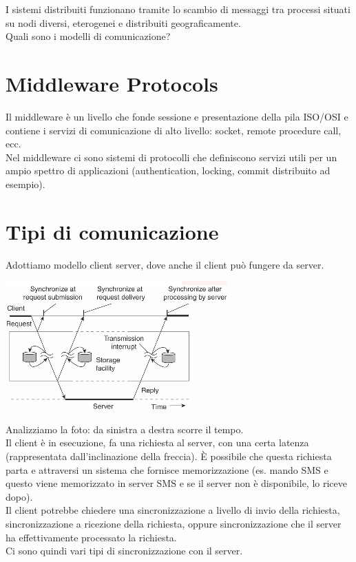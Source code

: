 I sistemi distribuiti funzionano tramite lo scambio di messaggi tra processi situati su nodi diversi, eterogenei e distribuiti geograficamente.\\
Quali sono i modelli di comunicazione?

\section{Middleware Protocols}
Il middleware è un livello che fonde sessione e presentazione della pila ISO/OSI e contiene i servizi di comunicazione di alto livello: socket, remote procedure call, ecc.\\
Nel middleware ci sono sistemi di protocolli che definiscono servizi utili per un ampio spettro di applicazioni (authentication, locking, commit distribuito ad esempio).

\section{Tipi di comunicazione}
Adottiamo modello client server, dove anche il client può fungere da server. 
\begin{center}
    \includegraphics[width = .6\textwidth]{images/lezione3/tipicomunicazione.png}
\end{center}
Analizziamo la foto: da sinistra a destra scorre il tempo. \\
Il client è in esecuzione, fa una richiesta al server, con una certa latenza (rappresentata dall'inclinazione della freccia). È possibile che questa richiesta parta e attraversi un sistema che fornisce memorizzazione (es. mando SMS e questo viene memorizzato in server SMS e se il server non è disponibile, lo riceve dopo).\\ 
Il client potrebbe chiedere una sincronizzazione a livello di invio della richiesta, sincronizzazione a  ricezione della richiesta, oppure sincronizzazione che il server ha effettivamente processato la richiesta. \\
Ci sono quindi vari tipi di sincronizzazione con il server.

